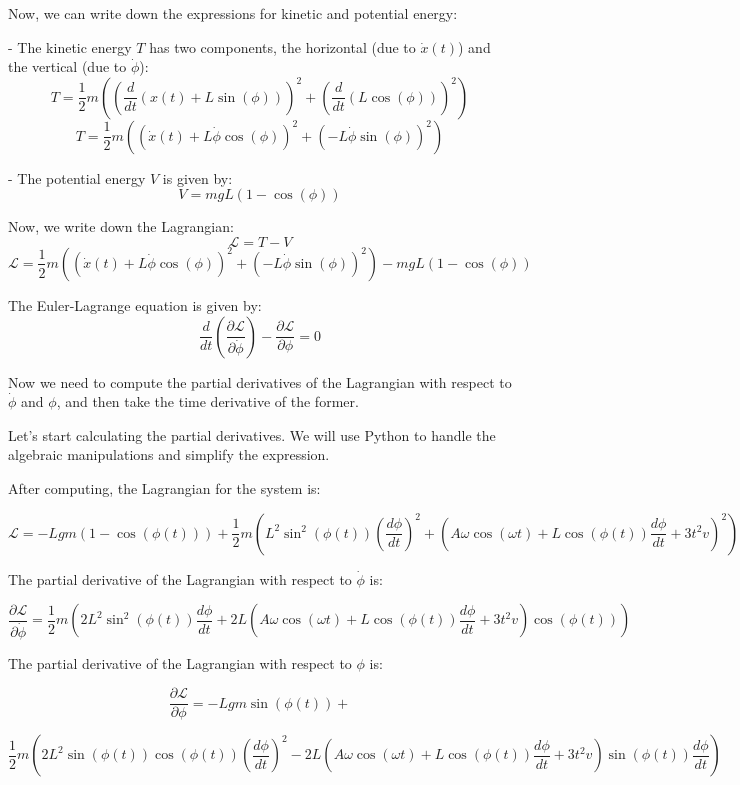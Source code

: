 Now, we can write down the expressions for kinetic and potential energy:

- The kinetic energy \( T \) has two components, the horizontal (due to \( \dot{x}(t) \)) and the vertical (due to \( \dot{\phi} \)):
\[ T = \frac{1}{2}m\left( \left(\frac{d}{dt}(x(t) + L \sin(\phi))\right)^2 + \left(\frac{d}{dt}(L \cos(\phi))\right)^2 \right) \]
\[ T = \frac{1}{2}m\left( \left(\dot{x}(t) + L\dot{\phi}\cos(\phi)\right)^2 + \left(-L\dot{\phi}\sin(\phi)\right)^2 \right) \]

- The potential energy \( V \) is given by:
\[ V = mgL(1 - \cos(\phi)) \]

Now, we write down the Lagrangian:
\[ \mathcal{L} = T - V \]
\[ \mathcal{L} = \frac{1}{2}m\left( \left(\dot{x}(t) + L\dot{\phi}\cos(\phi)\right)^2 + \left(-L\dot{\phi}\sin(\phi)\right)^2 \right) - mgL(1 - \cos(\phi)) \]

The Euler-Lagrange equation is given by:
\[ \frac{d}{dt}\left(\frac{\partial \mathcal{L}}{\partial \dot{\phi}}\right) - \frac{\partial \mathcal{L}}{\partial \phi} = 0 \]

Now we need to compute the partial derivatives of the Lagrangian with respect to \( \dot{\phi} \) and \( \phi \), and then take the time derivative of the former.

Let's start calculating the partial derivatives. We will use Python to handle the algebraic manipulations and simplify the expression.

After computing, the Lagrangian for the system is:

\[ \mathcal{L} = -Lgm(1 - \cos(\phi(t))) + \frac{1}{2}m\left(L^2\sin^2(\phi(t))\left(\frac{d\phi}{dt}\right)^2 + \left(A\omega\cos(\omega t) + L\cos(\phi(t))\frac{d\phi}{dt} + 3t^2v\right)^2\right) \]

The partial derivative of the Lagrangian with respect to \( \dot{\phi} \) is:

\[ \frac{\partial \mathcal{L}}{\partial \dot{\phi}} = \frac{1}{2}m\left(2L^2\sin^2(\phi(t))\frac{d\phi}{dt} + 2L(A\omega\cos(\omega t) + L\cos(\phi(t))\frac{d\phi}{dt} + 3t^2v)\cos(\phi(t))\right) \]

The partial derivative of the Lagrangian with respect to \( \phi \) is:

\[ \frac{\partial \mathcal{L}}{\partial \phi} = -Lgm\sin(\phi(t)) + \]

\[ \frac{1}{2}m\left(2L^2\sin(\phi(t))\cos(\phi(t))\left(\frac{d\phi}{dt}\right)^2 - 2L(A\omega\cos(\omega t) + L\cos(\phi(t))\frac{d\phi}{dt} + 3t^2v)\sin(\phi(t))\frac{d\phi}{dt}\right) \]

